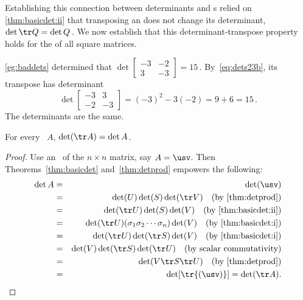 Establishing this connection between determinants and s relied on \autoref{thm:basicdet:ii} that transposing an  does not change its determinant, \(\det\tr Q=\det Q\)\,.
We now establish that this determinant-transpose property holds for the  of all square matrices.


\begin{example} \label{eg:}
\autoref{eg:baddets} determined that
\(\det\begin{bmatrix} -3&-2\\3&-3 \end{bmatrix}=15\)\,.
By~\eqref{eq:dets23b}, its transpose has determinant
\begin{equation*}
\det\begin{bmatrix} -3&3\\-2&-3 \end{bmatrix}
=(-3)^2-3(-2)=9+6=15\,.
\end{equation*}
The determinants are the same.
\end{example}




\begin{theorem} \label{thm:dettr} 
For every ~\(A\), \(\det(\tr A)=\det A\).
\end{theorem}
\begin{proof} 
Use an \svd\ of the \(n\times n\) matrix, say \(A=\usv\).
Then Theorems~\ref{thm:basicdet} and~\ref{thm:detprod} empowers the following:
\begin{eqnarray*}
\det A&=&\det(\usv)
\\&=&\det(U)\det(S)\det(\tr V)\quad(\text{by \autoref{thm:detprod}})
\\&=&\det(\tr U)\det(S)\det(V)\quad(\text{by \autoref{thm:basicdet:ii}})
\\&=&\det(\tr U)(\sigma_1\sigma_2\cdots\sigma_n)\det(V)\quad(\text{by \autoref{thm:basicdet:i}})
\\&=&\det(\tr U)\det(\tr S)\det(V)\quad(\text{by \autoref{thm:basicdet:i}})
\\&=&\det(V)\det(\tr S)\det(\tr U)\quad(\text{by scalar commutativity})
\\&=&\det(V\tr S\tr U)\quad(\text{by \autoref{thm:detprod}})
\\&=&\det[\tr{(\usv)}]=\det(\tr A).
\end{eqnarray*}
\end{proof}

